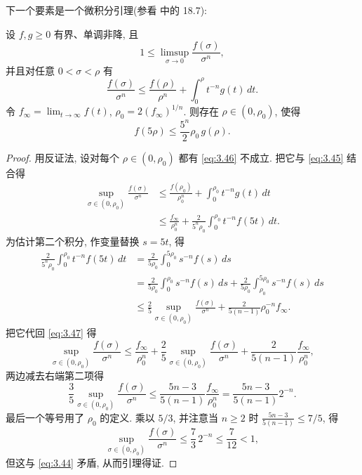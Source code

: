 下一个要素是一个微积分引理(参看 \cite{Si3} 中的 18.7):

\begin{lemma}
\label{lem:3.14}
设 $f,g\geq0$ 有界、单调非降, 且
\begin{equation}
1\leq\limsup_{\sigma\to0}\frac{f(\sigma)}{\sigma^n},
\label{eq:3.44}
\end{equation}
并且对任意 $0<\sigma<\rho$ 有
\begin{equation}
\frac{f(\sigma)}{\sigma^n}\leq\frac{f(\rho)}{\rho^n}
 +\int_0^\rho t^{-n}g(t)\,dt.
\label{eq:3.45}
\end{equation}
令 $f_\infty=\lim_{t\to\infty}f(t)$, $\rho_0=2(f_\infty)^{1/n}$. 则存在
$\rho\in(0,\rho_0)$, 使得
\begin{equation}
f(5\rho)\leq\frac{5^n}{2}\rho_0\,g(\rho).
\label{eq:3.46}
\end{equation}
\end{lemma}

\begin{proof}
用反证法, 设对每个 $\rho\in(0,\rho_0)$ 都有 \eqref{eq:3.46} 不成立. 把它与
\eqref{eq:3.45} 结合得
\begin{equation}
\begin{aligned}
\sup_{\sigma\in(0,\rho_0)}\frac{f(\sigma)}{\sigma^n}
&\leq\frac{f(\rho_0)}{\rho_0^n}+\int_0^{\rho_0}t^{-n}g(t)\,dt\\
&\leq\frac{f_\infty}{\rho_0^n}
 +\frac{2}{5^n\rho_0}\int_0^{\rho_0}t^{-n}f(5t)\,dt.
\end{aligned}
\label{eq:3.47}
\end{equation}
为估计第二个积分, 作变量替换 $s=5t$, 得
\[
\begin{aligned}
\frac{2}{5^n\rho_0}\int_0^{\rho_0}t^{-n}f(5t)\,dt
&=\frac{2}{5\rho_0}\int_0^{5\rho_0}s^{-n}f(s)\,ds\\
&=\frac{2}{5\rho_0}\int_0^{\rho_0}s^{-n}f(s)\,ds
 +\frac{2}{5\rho_0}\int_{\rho_0}^{5\rho_0}s^{-n}f(s)\,ds\\
&\leq\frac25\sup_{\sigma\in(0,\rho_0)}\frac{f(\sigma)}{\sigma^n}
 +\frac{2}{5(n-1)}\rho_0^{-n}f_\infty.
\end{aligned}
\]
把它代回 \eqref{eq:3.47} 得
\[
\sup_{\sigma\in(0,\rho_0)}\frac{f(\sigma)}{\sigma^n}
 \leq\frac{f_\infty}{\rho_0^n}
 +\frac25\sup_{\sigma\in(0,\rho_0)}\frac{f(\sigma)}{\sigma^n}
 +\frac{2}{5(n-1)}\frac{f_\infty}{\rho_0^n},
\]
两边减去右端第二项得
\begin{equation}
\frac35\sup_{\sigma\in(0,\rho_0)}\frac{f(\sigma)}{\sigma^n}
 \leq\frac{5n-3}{5(n-1)}\frac{f_\infty}{\rho_0^n}
 =\frac{5n-3}{5(n-1)}2^{-n}.
\label{eq:3.48}
\end{equation}
最后一个等号用了 $\rho_0$ 的定义. 乘以 $5/3$, 并注意当 $n\geq2$ 时
$\frac{5n-3}{5(n-1)}\leq7/5$, 得
\begin{equation}
\sup_{\sigma\in(0,\rho_0)}\frac{f(\sigma)}{\sigma^n}
 \leq\frac73\,2^{-n}\leq\frac7{12}<1,
\label{eq:3.49}
\end{equation}
但这与 \eqref{eq:3.44} 矛盾, 从而引理得证.
\end{proof}

